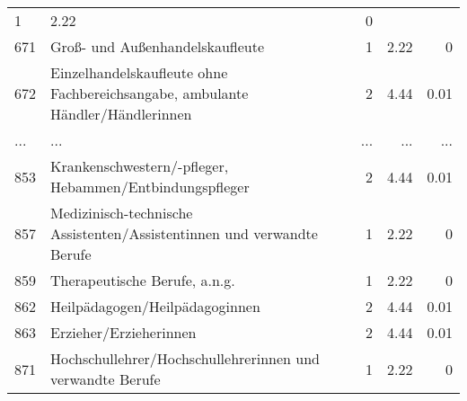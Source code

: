 \begin{longtable}{lXrrr}
          \num{1} &
          \num[round-mode=places,round-precision=2]{2.22} &
          \num[round-mode=places,round-precision=2]{0} \\
        671 & \multicolumn{1}{X}{Groß- und Außenhandelskaufleute} & %
          \num{1} &
          \num[round-mode=places,round-precision=2]{2.22} &
          \num[round-mode=places,round-precision=2]{0} \\
        672 & \multicolumn{1}{X}{Einzelhandelskaufleute ohne Fachbereichsangabe, ambulante Händler/Händlerinnen} & %
          \num{2} &
          \num[round-mode=places,round-precision=2]{4.44} &
          \num[round-mode=places,round-precision=2]{0.01} \\
       ... & ... & ... & ... & ... \\
        853 & \multicolumn{1}{X}{Krankenschwestern/-pfleger, Hebammen/Entbindungspfleger} & %
          \num{2} &
          \num[round-mode=places,round-precision=2]{4.44} &
          \num[round-mode=places,round-precision=2]{0.01} \\

        857 & \multicolumn{1}{X}{Medizinisch-technische Assistenten/Assistentinnen und verwandte Berufe} & %
          \num{1} &
          \num[round-mode=places,round-precision=2]{2.22} &
          \num[round-mode=places,round-precision=2]{0} \\

        859 & \multicolumn{1}{X}{Therapeutische Berufe, a.n.g.} & %
          \num{1} &
          \num[round-mode=places,round-precision=2]{2.22} &
          \num[round-mode=places,round-precision=2]{0} \\

        862 & \multicolumn{1}{X}{Heilpädagogen/Heilpädagoginnen} & %
          \num{2} &
          \num[round-mode=places,round-precision=2]{4.44} &
          \num[round-mode=places,round-precision=2]{0.01} \\

        863 & \multicolumn{1}{X}{Erzieher/Erzieherinnen} & %
          \num{2} &
          \num[round-mode=places,round-precision=2]{4.44} &
          \num[round-mode=places,round-precision=2]{0.01} \\

        871 & \multicolumn{1}{X}{Hochschullehrer/Hochschullehrerinnen und verwandte Berufe} & %
          \num{1} &
          \num[round-mode=places,round-precision=2]{2.22} &
          \num[round-mode=places,round-precision=2]{0} \\


\end{longtable}
